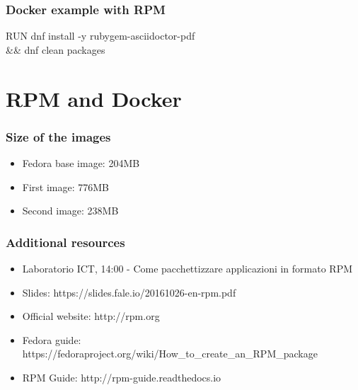 \documentclass[t,aspectratio=169]{beamer}
\begin{document}
\begin{frame}[fragile]
    \frametitle{Docker example with RPM}
    \begin{semiverbatim}
RUN dnf install -y rubygem-asciidoctor-pdf \\
  \&\& dnf clean packages
    \end{semiverbatim}
\end{frame}

\section{RPM and Docker}
\begin{frame}
    \frametitle{Size of the images}
    \begin{itemize}
        \item Fedora base image: 204MB
        \item<2-> First image: 776MB
        \item<3-> Second image: 238MB
    \end{itemize}
\end{frame}

\begin{frame}
    \frametitle{Additional resources}
    \begin{itemize}
        \item Laboratorio ICT, 14:00 - Come pacchettizzare applicazioni in formato RPM
        \item Slides: https://slides.fale.io/20161026-en-rpm.pdf
        \item Official website: http://rpm.org
        \item Fedora guide: https://fedoraproject.org/wiki/How\_to\_create\_an\_RPM\_package
        \item RPM Guide: http://rpm-guide.readthedocs.io
    \end{itemize}
\end{frame}

\end{document}
